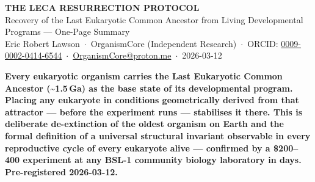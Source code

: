 \documentclass[9.5pt, a4paper]{article}
\begin{document}
\begin{center}
  {\large\bfseries\color{headerblue}
  THE LECA RESURRECTION PROTOCOL}\\[0.1em]
  {\small\color{headerblue}
  Recovery of the Last Eukaryotic Common Ancestor
  from Living Developmental Programs --- One-Page Summary}\\[0.1em]
  {\footnotesize
  Eric Robert Lawson\ $\cdot$\
  OrganismCore (Independent Research)\ $\cdot$\
  ORCID:
  \href{https://orcid.org/0009-0002-0414-6544}
  {0009-0002-0414-6544}\ $\cdot$\
  \href{mailto:OrganismCore@proton.me}
  {OrganismCore@proton.me}\ $\cdot$\
  2026-03-12}
\end{center}

\vspace{0.1em}

\begin{mdframed}[
  backgroundcolor=statementbox,
  linecolor=statementbox,
  linewidth=0pt,
  innertopmargin=0.3em,
  innerbottommargin=0.3em,
  innerleftmargin=0.7em,
  innerrightmargin=0.7em
]
\begin{center}
\footnotesize\bfseries\color{white}
Every eukaryotic organism carries the Last Eukaryotic Common
Ancestor (\textasciitilde{}1.5\,Ga) as the base state of its
developmental program. Placing any eukaryote in conditions
geometrically derived from that attractor --- before the
experiment runs --- stabilises it there.
This is deliberate de-extinction of the oldest organism on Earth
and the formal definition of a \textbf{universal structural
invariant} observable in every reproductive cycle of every
eukaryote alive --- confirmed by a \textbf{\$200--400}
experiment at any BSL-1 community biology laboratory
in \textbf{days}. Pre-registered 2026-03-12.
\end{center}
\end{mdframed}

\vspace{0.2em}
\end{document}
